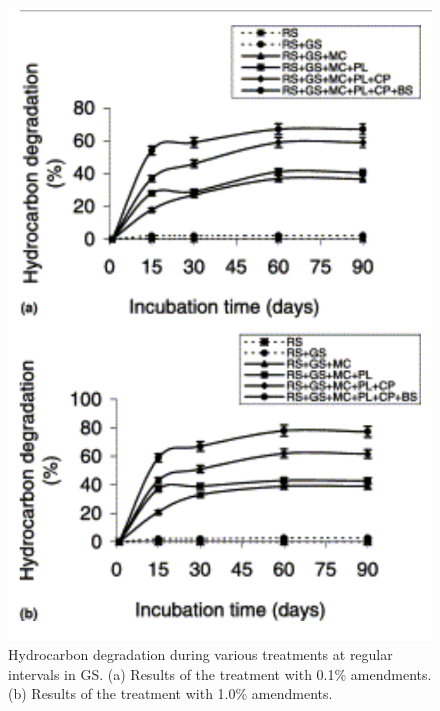 \documentclass[twocolumn]{article} %
\begin{document}
\begin{figure}[H]
    \centering
    \includegraphics[width=\columnwidth]{soil.png}
    \caption{Hydrocarbon degradation during various treatments at regular intervals in GS. (a) Results of the treatment with 0.1\% amendments. (b) Results of the treatment with 1.0\% amendments.}
\end{figure}
\end{document}
